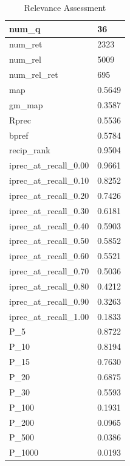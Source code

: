 \begin{table}[htb]
{\begin{tabular}{ | l | l | }
	num\_q & 36 \\ \hline
	num\_ret & 2323 \\ \hline
	num\_rel & 5009 \\ \hline
	num\_rel\_ret & 695 \\ \hline
	map & 0.5649 \\ \hline
	gm\_map & 0.3587 \\ \hline
	Rprec & 0.5536 \\ \hline
	bpref & 0.5784 \\ \hline
	recip\_rank & 0.9504 \\ \hline
	iprec\_at\_recall\_0.00 & 0.9661 \\ \hline
	iprec\_at\_recall\_0.10 & 0.8252 \\ \hline
	iprec\_at\_recall\_0.20 & 0.7426 \\ \hline
	iprec\_at\_recall\_0.30 & 0.6181 \\ \hline
	iprec\_at\_recall\_0.40 & 0.5903 \\ \hline
	iprec\_at\_recall\_0.50 & 0.5852 \\ \hline
	iprec\_at\_recall\_0.60 & 0.5521 \\ \hline
	iprec\_at\_recall\_0.70 & 0.5036 \\ \hline
	iprec\_at\_recall\_0.80 & 0.4212 \\ \hline
	iprec\_at\_recall\_0.90 & 0.3263 \\ \hline
	iprec\_at\_recall\_1.00 & 0.1833 \\ \hline
	P\_5 & 0.8722 \\ \hline
	P\_10 & 0.8194 \\ \hline
	P\_15 & 0.7630 \\ \hline
	P\_20 & 0.6875 \\ \hline
	P\_30 & 0.5593 \\ \hline
	P\_100 & 0.1931 \\ \hline
	P\_200 & 0.0965 \\ \hline
	P\_500 & 0.0386 \\ \hline
	P\_1000 & 0.0193 \\ \hline
    \end{tabular}
    \caption{Relevance Assessment}
    \label{table:manual-assessment}
    }
\end{table}

